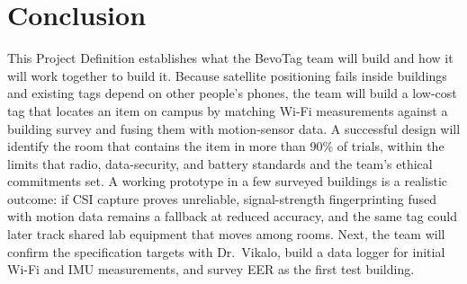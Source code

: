 \documentclass[12pt,letterpaper]{article}
\begin{document}
\section{Conclusion}
This Project Definition establishes what the BevoTag team will build and how it will work together
to build it. Because satellite positioning fails inside buildings and existing tags depend on other
people's phones, the team will build a low-cost tag that locates an item on campus by matching
Wi-Fi measurements against a building survey and fusing them with motion-sensor data. A successful
design will identify the room that contains the item in more than 90\% of trials, within the limits
that radio, data-security, and battery standards and the team's ethical commitments set. A working
prototype in a few surveyed buildings is a realistic outcome: if CSI capture proves unreliable,
signal-strength fingerprinting fused with motion data remains a fallback at reduced accuracy, and the
same tag could later track shared lab equipment that moves among rooms. Next, the team will confirm
the specification targets with Dr.\ Vikalo, build a data logger for initial Wi-Fi and IMU
measurements, and survey EER as the first test building.

\renewcommand{\refname}{References}
\makeatletter
\renewenvironment{thebibliography}[1]
  {\section{\refname}%
   \setstretch{1.0}%
   \list{\@biblabel{\@arabic\c@enumiv}}%
        {\settowidth\labelwidth{\@biblabel{#1}}%
         \setlength{\leftmargin}{0.5in}%
         \setlength{\labelsep}{\dimexpr0.5in-\labelwidth\relax}%
         \setlength{\itemsep}{\baselineskip}%
         \setlength{\parsep}{0pt}%
         \setlength{\topsep}{0pt}%
         \usecounter{enumiv}%
         \renewcommand\theenumiv{\@arabic\c@enumiv}%
         \def\makelabel##1{##1\hfil}}%
   \RaggedRight\exhyphenpenalty=50 }
  {\endlist}
\makeatother
\end{document}
